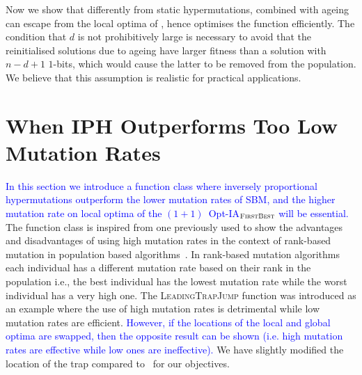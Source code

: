 \documentclass[lettersize,journal]{IEEEtran}
\newcommand{\new}[1]{\textcolor{blue}{#1}}
\begin{document}
Now we show that differently from static hypermutations, {\linHD }
combined with ageing can escape from the local optima of \cliff, 
hence optimises the function efficiently. The condition that $d$ is not prohibitively large is necessary to avoid
that the reinitialised solutions due to ageing have larger fitness than a solution with $n-d+1$ $1$-bits, {\color{blue} which would cause the latter to be removed from the population}.
We believe that this assumption is realistic for practical applications.

 
 
 {}
 
 
 
\section{When IPH Outperforms Too Low Mutation Rates}
\new{In this section we introduce a function class where inversely proportional hypermutations outperform the lower mutation rates of SBM, and the higher mutation rate on local optima of the $(1+1)$~Opt-IA$_{\textsc{FirstBest}}$ will be essential.}
The function class is inspired from one previously used to show the advantages and disadvantages of using high mutation rates in the context of rank-based mutation in population based algorithms~\cite{OlivetoLehreNeumann09}.
In rank-based mutation algorithms~\cite{RankBasedMutation} each individual has a different mutation rate based on their rank in the population i.e., the best individual has the lowest mutation rate while the worst individual has a very high one.
The \textsc{LeadingTrapJump} function was introduced as an example where the use of high mutation rates is detrimental while low mutation rates are efficient. \new{However, if the locations of the local and global optima are swapped, then the opposite result can be shown (i.e. high mutation rates are effective while low ones are ineffective).}
We have slightly modified the location of the trap compared to~\cite{OlivetoLehreNeumann09} for our objectives. 
\end{document}
